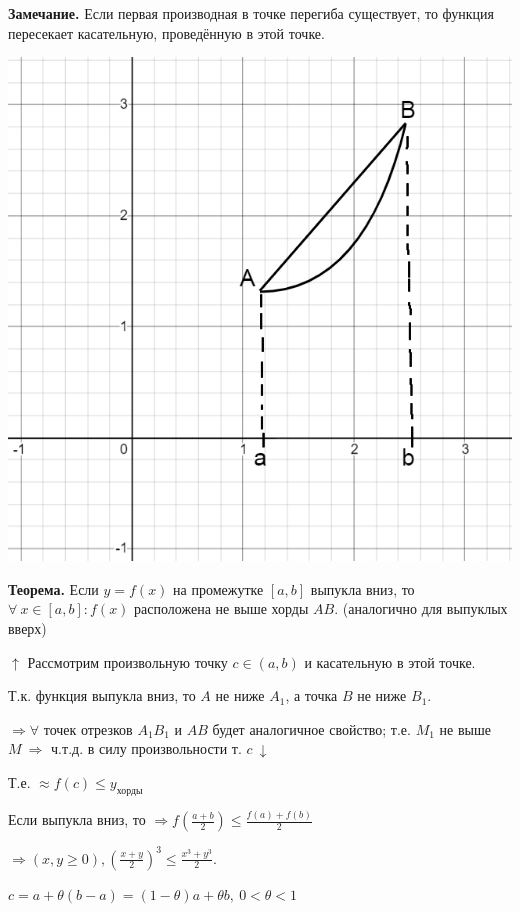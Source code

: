 \documentclass{article}
\begin{document}
\textbf{Замечание.} Если первая производная в точке перегиба существует, то функция пересекает касательную, проведённую в этой точке.

\includegraphics[scale=0.3]{11_1_11_7.png}

\textbf{Теорема.} Если \( y = f(x) \) на промежутке \( [a, b] \) выпукла вниз, то \( \forall\ x \in [a, b]: f(x) \) расположена не выше хорды \(AB\). (аналогично для выпуклых вверх)

\(\uparrow\) Рассмотрим произвольную точку \(c \in (a,b)\) и касательную в этой точке.

Т.к. функция выпукла вниз, то \(A\) не ниже \(A_1\), а точка \(B\) не ниже \(B_1\).

\(\Rightarrow \forall\) точек отрезков \(A_1B_1\) и \(AB\) будет аналогичное свойство; т.е. \(M_1\) не выше \(M\ \Rightarrow\) ч.т.д. в силу произвольности т. \(c\ \downarrow\)

Т.е. \(\approx f(c) \leq y_{\textrm{хорды}}\)

Если выпукла вниз, то \(\Rightarrow f(\frac{a+b}{2}) \leq \frac{f(a)+f(b)}{2}\)

\(\Rightarrow (x, y \geq 0), (\frac{x+y}{2})^3 \leq \frac{x^3 + y^3}{2}\).

\(c = a +\theta(b - a) = (1 - \theta)a + \theta b,\ 0 < \theta < 1\)
\end{document}
